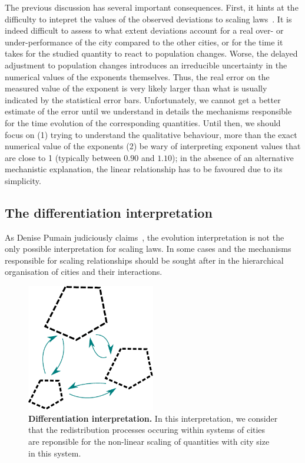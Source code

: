 The previous discussion has several important consequences. First, it hints at
the difficulty to intepret the values of the observed deviations to scaling
laws~\cite{Bettencourt:2010a}. It is indeed difficult to assess to what extent
deviations account for a real over- or under-performance of the city compared to
the other cities, or for the time it takes for the studied quantity to react to
population changes.  Worse, the delayed adjustment to population changes
introduces an irreducible uncertainty in the numerical values of the exponents
themselves. Thus, the real error on the measured value of the exponent is very
likely larger than what is usually indicated by the statistical error bars.
Unfortunately, we cannot get a better estimate of the error until we understand
in details the mechanisms responsible for the time evolution of the corresponding
quantities. Until then, we should focus on (1) trying to understand the
qualitative behaviour, more than the exact numerical value of the exponents (2)
be wary of interpreting exponent values that are close to 1 (typically between $0.90$ and
$1.10$); in the absence of an alternative mechanistic explanation, the linear
relationship has to be favoured due to its simplicity.


\subsection{The differentiation interpretation}
\label{sub:the_differentiation_interpretation}

As Denise Pumain judiciously claims~\cite{Pumain:2006,Pumain:2012}, the evolution
interpretation is not the only possible interpretation for scaling laws. In some
cases and the mechanisms responsible for scaling relationships should be sought
after in the hierarchical organisation of cities and their interactions.\\

\begin{figure}[!h]
    \centering
    \includegraphics[width=0.5\textwidth]{gfx/chapter-scaling/system-interpretation.pdf}
    \caption{{\bf Differentiation interpretation.} In this interpretation, we
    consider that the redistribution processes occuring within systems of cities
are reponsible for the non-linear scaling of quantities with city size in this
system.\label{fig:label_fig}}
\end{figure}

